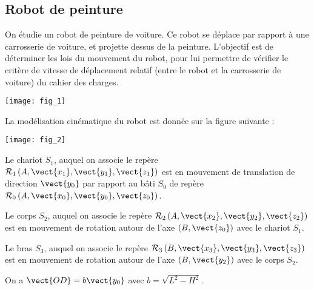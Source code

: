 \ifprof
\else
\begin{multicols}{2}
\fi


\subsection*{Robot de peinture}

\vspace{.25cm}

On étudie un robot de peinture de voiture. Ce robot se déplace par rapport à une carrosserie de voiture, et projette dessus de la peinture. L'objectif est de déterminer les lois du mouvement du robot, pour lui permettre de vérifier le critère de vitesse de déplacement relatif (entre le robot et la carrosserie de voiture) du cahier des charges.

\begin{center}
\texttt{[image: fig\_1]}

\end{center}

\vspace{.25cm}


La modélisation cinématique du robot est donnée sur la figure suivante :


\begin{center}
\texttt{[image: fig\_2]}
\end{center}



\vspace{.25cm}

Le chariot $S_1$, auquel on associe le repère $\mathcal{R}_1\left(A,\vect{x_1},\vect{y_1},\vect{z_1}\right)$ est en mouvement de translation de direction $\vect{y_0}$ par rapport au bâti $S_0$ de repère $\mathcal{R}_0\left(A,\vect{x_0},\vect{y_0},\vect{z_0}\right)$. 

Le corps $S_2$, auquel on associe le repère $\mathcal{R}_2\left(A,\vect{x_2},\vect{y_2},\vect{z_2}\right)$ est en mouvement de rotation autour de l'axe $(B,\vect{z_0})$ avec le chariot $S_1$. 

Le bras $S_3$, auquel on associe le repère $\mathcal{R}_3\left(B,\vect{x_3},\vect{y_3},\vect{z_3}\right)$ est en mouvement de rotation autour de l'axe $(B,\vect{y_2})$ avec le corps $S_2$. 

On a $\vect{OD}=b\vect{y_0}$ avec $b=\sqrt{L^2-H^2}$.





\end{multicols}
